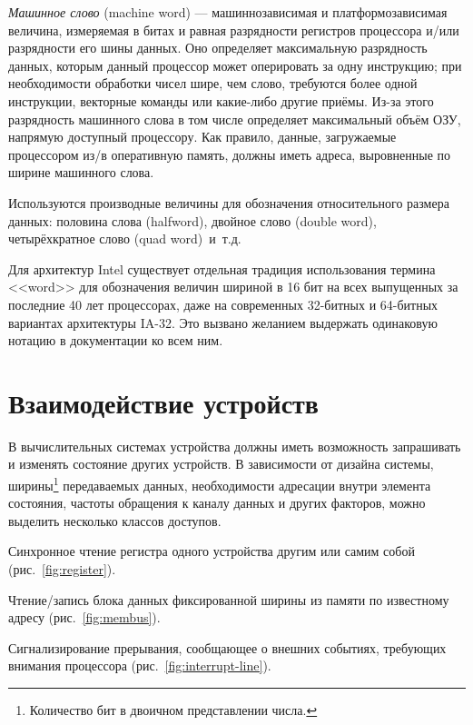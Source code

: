 \textit{Машинное слово} (\abbr machine word) --- машиннозависимая и платформозависимая величина, измеряемая в битах и равная разрядности регистров процессора и/или разрядности его шины данных. Оно определяет максимальную разрядность данных, которым данный процессор может оперировать за одну инструкцию; при необходимости обработки чисел шире, чем слово, требуются более одной инструкции, векторные команды или какие-либо другие приёмы. Из-за этого разрядность машинного слова в том числе определяет максимальный объём ОЗУ, напрямую доступный процессору. Как правило, данные, загружаемые процессором из/в оперативную память, должны иметь адреса, выровненные по ширине машинного слова.

Используются производные величины для обозначения относительного размера данных: половина слова (\abbr halfword), двойное слово (\abbr double word), четырёхкратное слово (\abbr quad word)~и~т.д.

Для архитектур Intel существует отдельная традиция использования термина <<word>> для обозначения величин шириной в 16 бит на всех выпущенных за последние 40 лет процессорах, даже на современных 32-битных и 64-битных вариантах архитектуры IA-32. Это вызвано желанием выдержать одинаковую нотацию в документации ко всем ним.

\section{Взаимодействие устройств}

В вычислительных системах устройства должны иметь возможность запрашивать и изменять состояние других устройств. В зависимости от дизайна системы, ширины\footnote{Количество бит в двоичном представлении числа.} передаваемых данных, необходимости адресации внутри элемента состояния, частоты обращения к каналу данных и других факторов, можно выделить несколько классов доступов.

\begin{itemize*}
\item Синхронное чтение регистра одного устройства другим или самим собой (рис.~\ref{fig:register}).
\item Чтение/запись блока данных фиксированной ширины из памяти по известному адресу (рис.~\ref{fig:membus}). 
\item Сигнализирование прерывания, сообщающее о внешних событиях, требующих внимания процессора (рис.~\ref{fig:interrupt-line}).
\end{itemize*}

